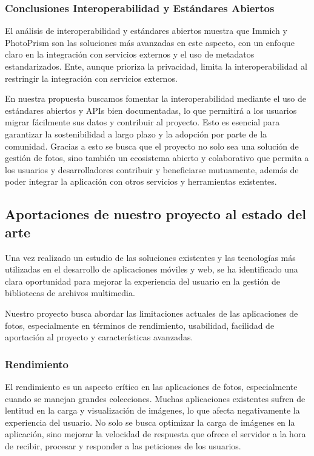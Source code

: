 \subsubsection{Conclusiones Interoperabilidad y Estándares Abiertos}
El análisis de interoperabilidad y estándares abiertos muestra que Immich y PhotoPrism son las soluciones más avanzadas en este aspecto, con un enfoque claro en la integración con servicios externos y el uso de metadatos estandarizados. Ente, aunque prioriza la privacidad, limita la interoperabilidad al restringir la integración con servicios externos.

En nuestra propuesta buscamos fomentar la interoperabilidad mediante el uso de estándares abiertos y APIs bien documentadas, lo que permitirá a los usuarios migrar fácilmente sus datos y contribuir al proyecto. Esto es esencial para garantizar la sostenibilidad a largo plazo y la adopción por parte de la comunidad.
Gracias a esto se busca que el proyecto no solo sea una solución de gestión de fotos, sino también un ecosistema abierto y colaborativo que permita a los usuarios y desarrolladores contribuir y beneficiarse mutuamente, además de poder integrar la aplicación con otros servicios y herramientas existentes.

\subsection{Aportaciones de nuestro proyecto al estado del arte}
Una vez realizado un estudio de las soluciones existentes y las tecnologías más utilizadas en el desarrollo de aplicaciones móviles y web, se ha identificado una clara oportunidad para mejorar la experiencia del usuario en la gestión de bibliotecas de archivos multimedia.

Nuestro proyecto busca abordar las limitaciones actuales de las aplicaciones de fotos, especialmente en términos de rendimiento, usabilidad, facilidad de aportación al proyecto y características avanzadas.
\subsubsection{Rendimiento}
El rendimiento es un aspecto crítico en las aplicaciones de fotos, especialmente cuando se manejan grandes colecciones. Muchas aplicaciones existentes sufren de lentitud en la carga y visualización de imágenes, lo que afecta negativamente la experiencia del usuario.
No solo se busca optimizar la carga de imágenes en la aplicación, sino mejorar la velocidad de respuesta que ofrece el servidor a la hora de recibir, procesar y responder a las peticiones de los usuarios.

